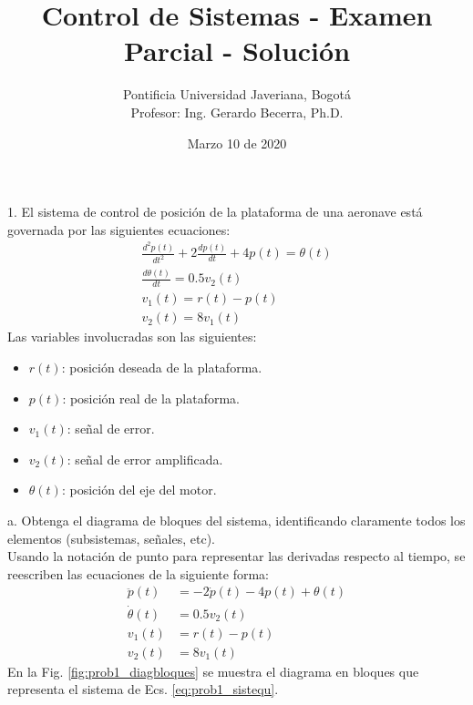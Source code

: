 \documentclass[11pt, spanish]{article}
\title{Control de Sistemas - Examen Parcial - Solución}
\author{Pontificia Universidad Javeriana, Bogotá\\Profesor: Ing. Gerardo Becerra, Ph.D.}
\date{Marzo 10 de 2020}
\begin{document}
	\maketitle
		\begin{description}
			\item 1. El sistema de control de posición de la plataforma de una aeronave está governada por las siguientes ecuaciones:
			\begin{align}
				\frac{d^2p(t)}{dt^2} + 2 \frac{dp(t)}{dt} + 4p(t) = \theta(t)\\
				\frac{d\theta(t)}{dt} = 0.5v_2(t)\\
				v_1(t) = r(t) - p(t)\\
				v_2(t) = 8v_1(t)
			\end{align}
			Las variables involucradas son las siguientes:
			\begin{itemize}
				\item $r(t)$: posición deseada de la plataforma.
				\item $p(t)$: posición real de la plataforma.
				\item $v_1(t)$: señal de error.
				\item $v_2(t)$: señal de error amplificada.
				\item $\theta(t)$: posición del eje del motor.
			\end{itemize}
			\begin{description}
				\item a. Obtenga el diagrama de bloques del sistema, identificando claramente todos los elementos (subsistemas, señales, etc).\\
				Usando la notación de punto para representar las derivadas respecto al tiempo, se reescriben las ecuaciones de la siguiente forma:
				\begin{subequations}
					\begin{align}
						\ddot{p}(t) &= -2 \dot{p}(t) - 4p(t) + \theta(t)\\
						\dot{\theta}(t) &= 0.5 v_2(t)\\
						v_1(t) &= r(t) - p(t)\\
						v_2(t) &= 8v_1(t)
					\end{align}
					\label{eq:prob1_sistequ}
				\end{subequations}
				En la Fig. \ref{fig:prob1_diagbloques} se muestra el diagrama en bloques que representa el sistema de Ecs. \ref{eq:prob1_sistequ}.
				\begin{figure}
					\centering

\end{figure}
\end{description}
\end{description}
\end{document}
